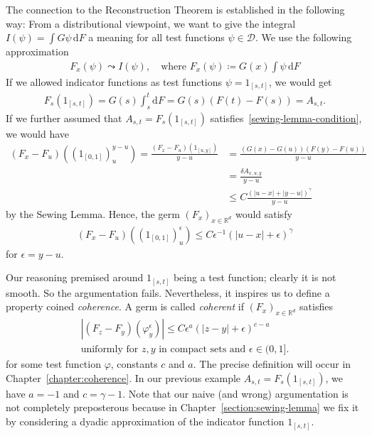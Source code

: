 The connection to the Reconstruction Theorem is established in the following way: From a distributional viewpoint, we want to give the integral \(I(\psi) = \int G \psi \, \mathrm{d}F\) a meaning for all test functions \( \psi \in \mathcal{D} \). We use the following approximation
\begin{align*}
    F_x(\psi)  \leadsto I(\psi), \quad \text{where } F_x(\psi) \coloneqq G(x)\int \psi \, \mathrm{d}F 
\end{align*}
If we allowed indicator functions as test functions \(\psi = 1_{[s,t]}\), we would get
\begin{align*}
    F_s(1_{[s,t]}) = G(s) \int^t_s \mathrm{d}F = G(s)(F(t) - F(s)) = A_{s,t}.
\end{align*}
If we further assumed that \(A_{s,t} = F_s(1_{[s,t]})\) satisfies~\eqref{sewing-lemma-condition}, we would have 
\begin{align*}
    (F_x - F_u)({(1_{[0,1]})}^{y-u}_u) = \frac{(F_x - F_u)(1_{[u,y]})}{y-u} &= \frac{(G(x) - G(u))(F(y) - F(u))}{y-u} \\
    &= \frac{\delta A_{x,u,y}}{y-u}\\
    &\leq C \frac{ {(|u-x| + |y-u|)}^\gamma}{y-u}
\end{align*} 
by the Sewing Lemma. Hence, the germ \({(F_x)}_{x \in \mathbb{R}^d}\) would satisfy
\begin{align*}
    (F_x - F_u)({(1_{[0,1]})}^{\epsilon}_u) \leq C \epsilon^{-1}{(|u-x| + \epsilon)}^\gamma
\end{align*}
for \(\epsilon = y-u\). 

Our reasoning premised around \( 1_{[s,t]} \) being a test function; clearly it is not smooth. So the argumentation fails. Nevertheless, it inspires us to define a property coined \emph{coherence}. A germ is called \emph{coherent} if \( (F_x)_{x \in \mathbb{R}^d} \) satisfies
\begin{gather}\label{pre-condition-coherence}
    |(F_z - F_y)(\varphi^\epsilon_y)| \leq C\epsilon^{a}{(|z-y| + \epsilon)}^{c - a}  \\ \text{uniformly for \(z,y\) in compact sets and \(\epsilon \in (0,1]\)} \nonumber. %
\end{gather}
for some test function \(\varphi\), constants  \(c\) and \(a\).
The precise definition will occur in Chapter~\ref{chapter:coherence}. In our previous example \(A_{s,t} = F_s(1_{[s,t]})\), we have \(a = -1\) and \(c = \gamma - 1\). Note that our naive (and wrong) argumentation is not completely preposterous because in Chapter~\ref{section:sewing-lemma} we fix it by considering a dyadic approximation of the indicator function \( 1_{[s,t]} \).

